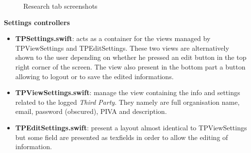\documentclass[titlepage]{article}
\begin{document}
{		\begin{figure}[H]%
			\centering
			\qquad
			\caption{Research tab screenshots}%
			\label{fig:RequestTab}%
		\end{figure}
		
		{\bf Settings controllers}
		\begin{itemize}
			\item {\bf TPSettings.swift}:  acts as a container for the views managed by TPViewSettings and TPEditSettings. These two views are alternatively shown to the user depending on whether he pressed an edit button in the top right corner of the screen. The view also present in the bottom part a button allowing to logout or to save the edited informations.
			\item {\bf TPViewSettings.swift}: manage the view containing the info and settings related to the logged {\it Third Party}. They namely are full organisation name, email, password (obscured), PIVA and description.
			\item {\bf TPEditSettings.swift}: present a layout almost identical to TPViewSettings but some field are presented as texfields in order to allow the editing of information.
			

\end{itemize}}
\end{document}

